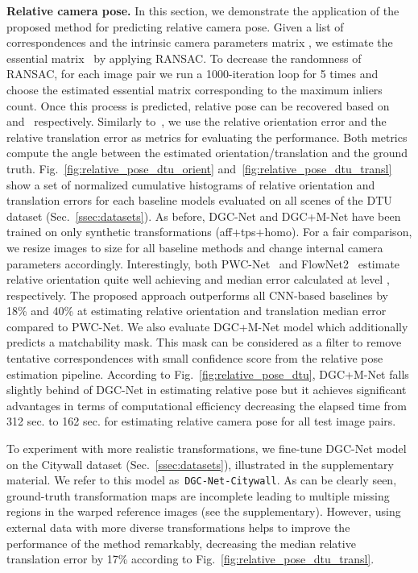 \documentclass[10pt,twocolumn,letterpaper]{article}
\begin{document}
\noindent\textbf{Relative camera pose.} In this section, we demonstrate the application of the proposed method for predicting relative camera pose. Given a list of correspondences and the intrinsic camera parameters matrix , we estimate the essential matrix~ by applying RANSAC. To decrease the randomness of RANSAC, for each image pair we run a 1000-iteration loop for 5 times and choose the estimated essential matrix corresponding to the maximum inliers count. Once this process is predicted, relative pose can be recovered based on~ and~ respectively. Similarly to~\cite{RelativePoseCNN}, we use the relative orientation error and the relative translation error as metrics for evaluating  the performance. Both metrics compute the angle between the estimated orientation/translation and the ground truth. Fig.~\ref{fig:relative_pose_dtu_orient} and~\ref{fig:relative_pose_dtu_transl} show a set of normalized cumulative histograms of relative orientation and translation errors for each baseline models evaluated on all scenes of the DTU dataset (Sec.~\ref{ssec:datasets}). As before, DGC-Net and DGC+M-Net have been trained on only synthetic transformations (aff+tps+homo). For a fair comparison, we resize images to  size for all baseline methods and change internal camera parameters accordingly. Interestingly, both PWC-Net~\cite{PWC-Net} and FlowNet2~\cite{FlowNet2} estimate relative orientation quite well achieving  and  median error calculated at level , respectively. The proposed approach outperforms all CNN-based baselines by 18\% and 40\% at estimating relative orientation and translation median error compared to PWC-Net. We also evaluate DGC+M-Net model which additionally predicts a matchability mask. This mask can be considered as a filter to remove tentative correspondences with small confidence score from the relative pose estimation pipeline. According to Fig.~\ref{fig:relative_pose_dtu}, DGC+M-Net falls slightly behind of DGC-Net in estimating relative pose but it achieves significant advantages in terms of computational efficiency decreasing the elapsed time from 312 sec. to 162 sec. for estimating relative camera pose for all test image pairs. 

To experiment with more realistic transformations, we fine-tune DGC-Net model on the Citywall dataset (Sec.~\ref{ssec:datasets}), illustrated in the supplementary material. We refer to this model as~\texttt{DGC-Net-Citywall}. As can be clearly seen, ground-truth transformation maps are incomplete leading to multiple missing regions in the warped reference images (see the supplementary). However, using external data with more diverse transformations helps to improve the performance of the method remarkably, decreasing the median relative translation error by 17\% according to Fig.~\ref{fig:relative_pose_dtu_transl}. 
\end{document}
